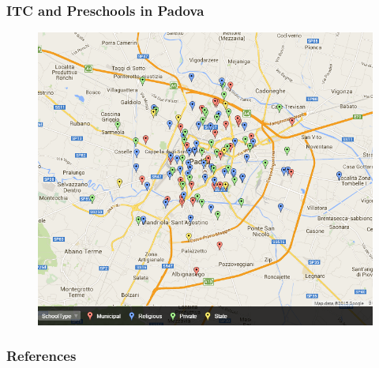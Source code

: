 \documentclass[xcolor=table]{beamer}
\begin{document}
\begin{frame}
\frametitle{ITC and Preschools in Padova}
\begin{center}
\begin{figure}
\includegraphics[height=0.9\textheight]{PadovaSchools.png}
\label{fig:PadovaSchools} 
\hyperlink{frame:treatment}{}
\end{figure}
\end{center}
\end{frame} 

\begin{frame}[allowframebreaks]  %
\frametitle{References}
\begin{tiny}

\end{tiny}
\end{frame}
\end{document}
